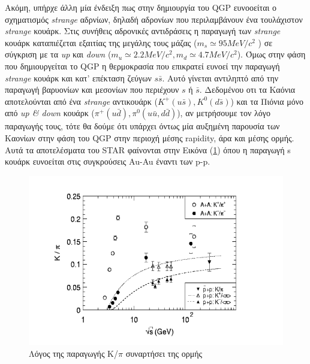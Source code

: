 	Ακόμη, υπήρχε άλλη μία ένδειξη πως στην δημιουργία του QGP ευνοοείται ο σχηματισμός \textit{strange} αδρνίων, δηλαδή αδρονίων που περιλαμβάνουν ένα τουλάχιστον \textit{strange } κουάρκ. Στις συνήθεις αδρονικές αντιδράσεις η παραγωγή των \textit{strange} κουάρκ καταπιέζεται εξαιτίας της μεγάλης τους μάζας ($m_s\simeq 95MeV/c^2$ ) σε σύγκριση με τα \textit{up} και \textit{down} ($m_u\simeq2.2MeV/c^2, m_d\simeq4.7MeV/c^2$). 
	Όμως στην φάση που δημιουργείται το QGP η θερμοκρασία που επικρατεί ευνοεί την παραγωγή \textit{strange} κουάρκ  και κατ' επέκταση ζεύγων $s\bar{s}$. Αυτό γίνεται αντιληπτό από την παραγωγή βαρυονίων και μεσονίων που περιέχουν $s$ ή $\bar{s}$. 
	Δεδομένου οτι τα Καόνια αποτελούνται από ένα \textit{strange} αντικουάρκ ($K^+(u\bar{s}), K^0(d\bar{s})$) και τα Πιόνια μόνο από \textit{up \& down} κουάρκ    ($\pi^+(u\bar{d}), \pi^0(u\bar{u},d\bar{d})$), αν μετρήσουμε τον λόγο παραγωγής τους, τότε θα δούμε ότι υπάρχει όντως μία αυξημένη παρουσία των Καονίων στην φάση του QGP στην περιοχή μέσης rapidity, άρα και μέσης ορμής. Αυτά τα αποτελέσματα του STAR φαίνονται στην Εικόνα (\ref{fig4.10}) όπου η παραγωγή s κουάρκ ευνοείται στις συγκρούσεις Au-Au έναντι των p-p.
	
	\begin{figure}[h!]
		\centering
		\includegraphics[scale=0.7]{STAR_Results/strange_enhancement}
		\caption{Λόγος της παραγωγής Κ/$\pi$ συναρτήσει της ορμής}
		\label{fig4.10}
	\end{figure}
	
